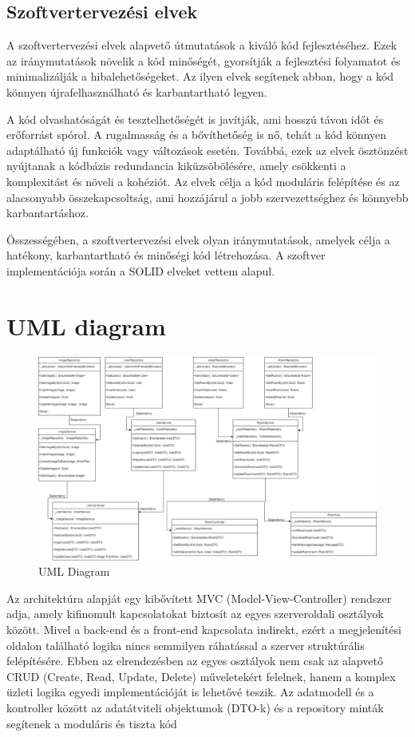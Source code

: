 \subsection*{Szoftvertervezési elvek}
A szoftvertervezési elvek alapvető útmutatások a kiváló kód fejlesztéséhez. Ezek az iránymutatások növelik a kód minőségét, gyorsítják a fejlesztési folyamatot és minimalizálják a hibalehetőségeket. Az ilyen elvek segítenek abban, hogy a kód könnyen újrafelhasználható és karbantartható legyen.

A kód olvashatóságát és tesztelhetőségét is javítják, ami hosszú távon időt és erőforrást spórol. A rugalmasság és a bővíthetőség is nő, tehát a kód könnyen adaptálható új funkciók vagy változások esetén. Továbbá, ezek az elvek ösztönzést nyújtanak a kódbázis redundancia kiküzsöbölésére, amely csökkenti a komplexitást és növeli a kohéziót. Az elvek célja a kód moduláris felépítése és az alacsonyabb összekapcsoltság, ami hozzájárul a jobb szervezettséghez és könnyebb karbantartáshoz.

Összességében, a szoftvertervezési elvek olyan iránymutatások, amelyek célja a hatékony, karbantartható és minőségi kód létrehozása.
A szoftver implementációja során a SOLID elveket vettem alapul.

\section*{UML diagram}

\begin{figure}[H]
    \centering
    \includegraphics[width=14.0truecm]{images/UML_Diagram.png}
    \caption{UML Diagram}
    \label{fig:uml_diagram}
\end{figure}

Az architektúra alapját egy kibővített MVC (Model-View-Controller) rendszer adja,
amely kifinomult kapcsolatokat biztosít az egyes szerveroldali osztályok között. Mivel a back-end és a front-end kapcsolata indirekt,
ezért a megjelenítési oldalon található logika nincs semmilyen ráhatással a szerver struktúrális felépítésére.
Ebben az elrendezésben az egyes osztályok nem csak az alapvető CRUD (Create,
Read, Update, Delete) műveletekért felelnek, hanem a komplex üzleti logika egyedi
implementációját is lehetővé teszik. Az adatmodell és a kontroller között az adatátviteli objektumok (DTO-k) és a repository minták segítenek a moduláris és tiszta kód

